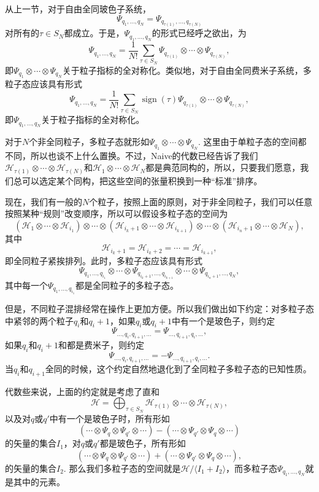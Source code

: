 \documentclass[11pt]{article}
\theoremstyle{definition}
\theoremstyle{plain}
\begin{document}
从上一节，对于自由全同玻色子系统，
\[
	\Psi_{q_1,\dots,q_N}=\Psi_{q_{\tau(1)},\dots,q_{\tau(N)}}
\]
对所有的$\tau\in S_N$都成立。于是，$\Psi_{q_1,\dots,q_N}$的形式已经呼之欲出，为
\[
	\Psi_{q_1,\dots,q_N}=\frac{1}{N!}\sum_{\tau\in S_N}\Psi_{q_{\tau(1)}}\otimes \cdots \otimes \Psi_{q_{\tau(N)}},
\]
即$\Psi_{q_1}\otimes \cdots \otimes \Psi_{q_N}$关于粒子指标的全对称化。类似地，对于自由全同费米子系统，多粒子态应该具有形式
\[
	\Psi_{q_1,\dots,q_N}=\frac{1}{N!}\sum_{\tau\in S_N}\operatorname{sign}(\tau)\Psi_{q_{\tau(1)}}\otimes \cdots \otimes \Psi_{q_{\tau(N)}},
\]
即$\Psi_{q_1,\dots,q_N}$关于粒子指标的全对称化。

对于$N$个非全同粒子，多粒子态就形如$\Psi_{q_1}\otimes \cdots \otimes \Psi_{q_N}$. 这里由于单粒子态的空间都不同，所以也谈不上什么置换。不过，Naive的代数已经告诉了我们$\mathcal{H}_{\tau(1)}\otimes \cdots \otimes \mathcal{H}_{\tau(N)}$和$\mathcal{H}_{1}\otimes \cdots \otimes \mathcal{H}_{N}$都是典范同构的，所以，只要我们愿意，我们总可以选定某个同构，把这些空间的张量积换到一种“标准”排序。

现在，我们有一般的$N$个粒子，按照上面的原则，对于非全同粒子，我们可以任意按照某种“规则”改变顺序，所以可以假设多粒子态的空间为
\[
(\mathcal H_1\otimes\cdots\otimes\mathcal H_{i_1})\otimes \cdots \otimes (\mathcal H_{i_k+1}\otimes\cdots\otimes\mathcal H_{i_{k+1}})\otimes \cdots \otimes (\mathcal H_{i_n+1}\otimes\cdots\otimes\mathcal H_{N}),
\]
其中
\[
	\mathcal H_{i_k+1}=\mathcal H_{i_k+2}=\cdots=\mathcal H_{i_{k+1}},
\]
即全同粒子紧挨排列。此时，多粒子态应该具有形式
\[
	\Psi_{q_1,\dots,q_{i_1}}\otimes \cdots\otimes \Psi_{q_{i_k+1},\dots,q_{i_{k+1}}}\otimes \cdots \otimes \Psi_{q_{i_n+1},\dots,q_N},
\]
其中每一个$\Psi_{q_1,\dots,q_{i_1}}$都是全同粒子的多粒子态。

但是，不同粒子混排经常在操作上更加方便。所以我们做出如下约定：对多粒子态中紧邻的两个粒子$q_i$和$q_i+1$，如果$q_i$或$q_i+1$中有一个是玻色子，则约定
\[
	\Psi_{\dots,q_i,q_{i+1},\dots}=\Psi_{\dots,q_{i+1},q_{i},\dots},
\]
如果$q_i$和$q_i+1$和都是费米子，则约定
\[
	\Psi_{\dots,q_i,q_{i+1},\dots}=-\Psi_{\dots,q_{i+1},q_{i},\dots}.
\]
当$q_i$和$q_{i+1}$全同的时候，这个约定自然地退化到了全同粒子多粒子态的已知性质。

代数些来说，上面的约定就是考虑了直和
\[
	\mathcal{H}=\bigoplus_{\tau\in S_N}\mathcal{H}_{\tau(1)}\otimes\cdots\otimes \mathcal{H}_{\tau(N)},
\]
以及对$q$或$q'$中有一个是玻色子时，所有形如
\[
	(\cdots\otimes \Psi_{q}\otimes \Psi_{q'}\otimes \cdots)-(\cdots\otimes \Psi_{q'}\otimes \Psi_{q}\otimes \cdots)
\]
的矢量的集合$I_1$，对$q$或$q'$都是玻色子，所有形如
\[
	(\cdots\otimes \Psi_{q}\otimes \Psi_{q'}\otimes \cdots)+(\cdots\otimes \Psi_{q'}\otimes \Psi_{q}\otimes \cdots),
\]
的矢量的集合$I_2$. 那么我们多粒子态的空间就是$\mathcal{H}/\langle I_1 + I_2 \rangle$，而多粒子态$\Psi_{q_1,\dots,q_N}$就是其中的元素。
\end{document}
